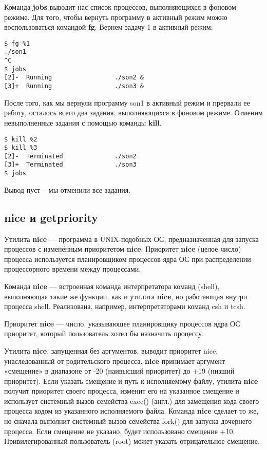 \documentclass[a4paper]{article}
\begin{document}
	Команда \textbf{jobs} выводит нас список процессов, выполняющихся в фоновом режиме. Для того, чтобы вернуть программу в активный режим можно воспользоваться командой \textbf{fg}. Вернем задачу 1 в активный режим:
	\begin{lstlisting}[style=crs_bash]
$ fg %1
./son1
^C
$ jobs
[2]-  Running                 ./son2 &
[3]+  Running                 ./son3 &
	\end{lstlisting}	
	
	После того, как мы вернули программу son1 в активный режим и прервали ее работу, осталось всего два задания, выполняющихся в фоновом режиме. Отменим невыполненные задания с помощью команды \textbf{kill}.	
	\begin{lstlisting}[style=crs_bash]
$ kill %2
$ kill %3
[2]-  Terminated              ./son2
[3]+  Terminated              ./son3
$ jobs
	\end{lstlisting}	
	
	Вывод пуст -- мы отменили все задания.
	
	\subsection{nice и getpriority}
	Утилита \textbf{nice} --- программа в UNIX-подобных ОС, предназначенная для запуска процессов с изменённым приоритетом \textbf{nice}. Приоритет \textbf{nice} (целое число) процесса используется планировщиком процессов ядра ОС при распределении процессорного времени между процессами.
	
	Команда \textbf{nice} --- встроенная команда интерпретатора команд (shell), выполняющая такие же функции, как и утилита \textbf{nice}, но работающая внутри процесса shell. Реализована, например, интерпретаторами команд csh и tcsh.

	Приоритет \textbf{nice} --- число, указывающее планировщику процессов ядра ОС приоритет, который пользователь хотел бы назначить процессу.
	
	Утилита \textbf{nice}, запущенная без аргументов, выводит приоритет nice, унаследованный от родительского процесса. \textbf{nice} принимает аргумент «смещение» в диапазоне от -20 (наивысший приоритет) до +19 (низший приоритет). Если указать смещение и путь к исполняемому файлу, утилита \textbf{nice} получит приоритет своего процесса, изменит его на указанное смещение и использует системный вызов семейства exec() (англ.) для замещения кода своего процесса кодом из указанного исполняемого файла. Команда \textbf{nice} сделает то же, но сначала выполнит системный вызов семейства fork() для запуска дочернего процесса. Если смещение не указано, будет использовано смещение +10. Привилегированный пользователь (root) может указать отрицательное смещение.
\end{document}
